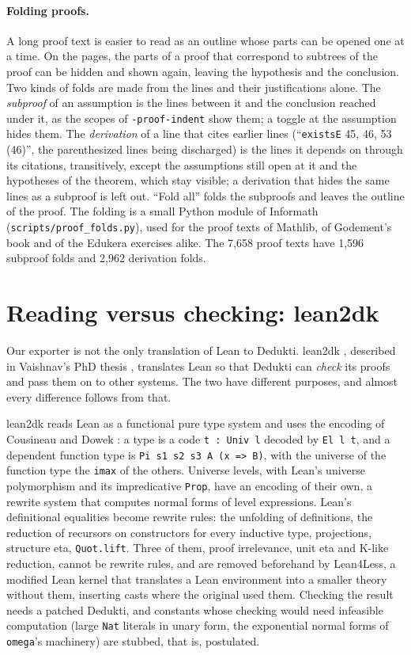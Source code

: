 \documentclass{easychair}
\newcommand{\ttt}[1]{\texttt{#1}}
\begin{document}
\paragraph{Folding proofs.} A long proof text is easier to read as an outline whose parts can be
opened one at a time. On the pages, the parts of a proof that correspond to subtrees of the proof
can be hidden and shown again, leaving the hypothesis and the conclusion. Two kinds of folds are
made from the lines and their justifications alone. The \emph{subproof} of an assumption is the
lines between it and the conclusion reached under it, as the scopes of \ttt{-proof-indent} show
them; a toggle at the assumption hides them. The \emph{derivation} of a line that cites earlier
lines (``\ttt{existsE} 45, 46, 53 (46)'', the parenthesized lines being discharged) is the lines
it depends on through its citations, transitively, except the assumptions still open at it and
the hypotheses of the theorem, which stay visible; a derivation that hides the same lines as a
subproof is left out. ``Fold all'' folds the subproofs and leaves the outline of the proof. The
folding is a small Python module of Informath (\ttt{scripts/proof\_folds.py}), used for the
proof texts of Mathlib, of Godement's book \cite{godement-index} and of the Edukera exercises
alike. The 7,658 proof texts have 1,596 subproof folds and 2,962 derivation folds.

\section{Reading versus checking: lean2dk}
\label{sec:lean2dk}

Our exporter is not the only translation of Lean to Dedukti. lean2dk
\cite{lean2dk}, described in Vaishnav's PhD thesis \cite{vaishnav-2026}, translates Lean so
that Dedukti can \emph{check} its proofs and pass them on to other systems. The two have
different purposes, and almost every difference follows from that.

lean2dk reads Lean as a functional pure type system and uses the encoding of Cousineau and
Dowek \cite{cousineau-dowek-2007}: a type is a code \ttt{t : Univ l} decoded by \ttt{El l t},
and a dependent function type is \ttt{Pi s1 s2 s3 A (x => B)}, with the universe of the
function type the \ttt{imax} of the others. Universe levels, with Lean's universe polymorphism
and its impredicative \ttt{Prop}, have an encoding of their own, a rewrite system that computes
normal forms of level expressions. Lean's definitional equalities become rewrite rules: the
unfolding of definitions, the reduction of recursors on constructors for every inductive type,
projections, structure eta, \ttt{Quot.lift}. Three of them, proof irrelevance, unit eta and
K-like reduction, cannot be rewrite rules, and are removed beforehand by Lean4Less, a modified
Lean kernel that translates a Lean environment into a smaller theory without them, inserting
casts where the original used them. Checking the result needs a patched Dedukti, and constants
whose checking would need infeasible computation (large \ttt{Nat} literals in unary form, the
exponential normal forms of \ttt{omega}'s machinery) are stubbed, that is, postulated.
\end{document}
